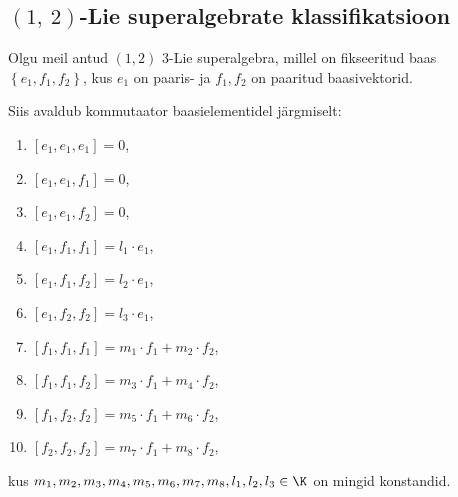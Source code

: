 \subsection{\texorpdfstring{$(1,\ 2)$} 3-Lie superalgebrate klassifikatsioon}

Olgu meil antud $(1, 2)$ 3-Lie superalgebra, millel on fikseeritud baas
$\left\{ e_1, f_1, f_2 \right\}$, kus $e_1$ on paaris- ja
$f_1, f_2$ on paaritud baasivektorid.

Siis avaldub kommutaator baasielementidel järgmiselt:

\begin{multicols}{2}
\begin{enumerate}
    \item $\left[ e_1, e_1, e_1 \right] = 0$,
    \item $\left[ e_1, e_1, f_1 \right] = 0$,
    \item $\left[ e_1, e_1, f_2 \right] = 0$,
    \item $\left[ e_1, f_1, f_1 \right] = l_1 \cdot e_1$,
    \item $\left[ e_1, f_1, f_2 \right] = l_2 \cdot e_1$,
    \item $\left[ e_1, f_2, f_2 \right] = l_3 \cdot e_1$,
    \item $\left[ f_1, f_1, f_1 \right] = m_1 \cdot f_1 + m_2 \cdot f_2$,
    \item $\left[ f_1, f_1, f_2 \right] = m_3 \cdot f_1 + m_4 \cdot f_2$,
    \item $\left[ f_1, f_2, f_2 \right] = m_5 \cdot f_1 + m_6 \cdot f_2$,
    \item $\left[ f_2, f_2, f_2 \right] = m_7 \cdot f_1 + m_8 \cdot f_2$,
\end{enumerate}
\end{multicols}
kus $m_1, m_2, m_3, m_4, m_5, m_6, m_7, m_8, l_1, l_2, l_3 \in \K$
on mingid konstandid.

